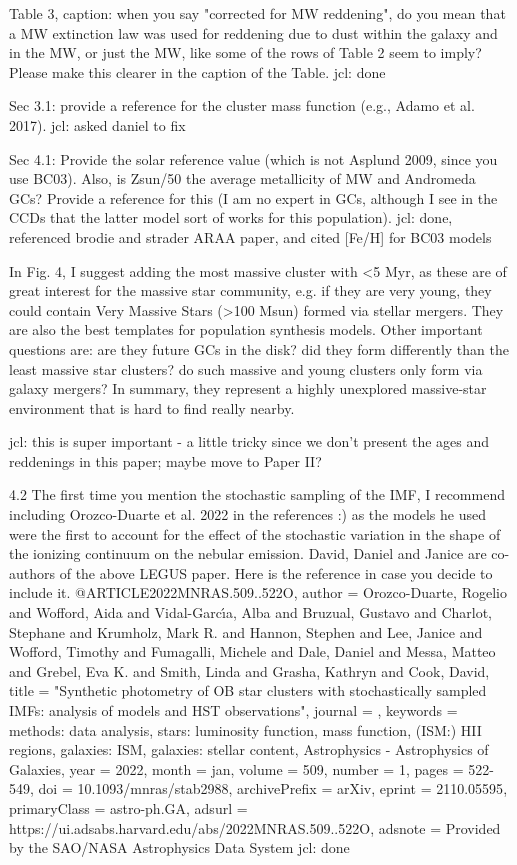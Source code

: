 Table 3, caption: when you say "corrected for MW reddening", do you mean that a MW extinction law was used for reddening due to dust within the galaxy and in the MW, or just the MW, like some of the rows of Table 2 seem to imply? Please make this clearer in the caption of the Table.
jcl: done


Sec 3.1: provide a reference for the cluster mass function (e.g., Adamo et al. 2017). 
jcl: asked daniel to fix


Sec 4.1: Provide the solar reference value (which is not Asplund 2009, since you use BC03). Also, is  Zsun/50 the average metallicity of MW and Andromeda GCs? Provide a reference for this (I am no expert in GCs, although I see in the CCDs that the latter model sort of works for this population).
jcl: done, referenced brodie and strader ARAA paper, and cited [Fe/H] for BC03 models


In Fig. 4, I suggest adding the most massive cluster with <5 Myr, as these are of great interest for the massive star community, e.g. if they are very young, they could contain Very Massive Stars (>100 Msun) formed via stellar mergers. They are also the best templates for population synthesis models. Other important questions are: are they future GCs in the disk? did they form differently than the least massive star clusters? do such massive and young clusters only form via galaxy mergers? In summary, they represent a highly unexplored massive-star environment that is hard to find really nearby.

jcl: this is super important -  a little tricky since we don't present the ages and reddenings in this paper; maybe move to Paper II?


4.2 The first time you mention the stochastic sampling of the IMF, I recommend including Orozco-Duarte et al. 2022 in the references :)  as the models he used were the first to account for the effect of the stochastic variation in the shape of the ionizing continuum on the nebular emission. David, Daniel and Janice are co-authors of the above LEGUS paper. Here is the reference in case you decide to include it.
@ARTICLE{2022MNRAS.509..522O,
       author = {{Orozco-Duarte}, Rogelio and {Wofford}, Aida and {Vidal-Garc{\'\i}a}, Alba and {Bruzual}, Gustavo and {Charlot}, Stephane and {Krumholz}, Mark R. and {Hannon}, Stephen and {Lee}, Janice and {Wofford}, Timothy and {Fumagalli}, Michele and {Dale}, Daniel and {Messa}, Matteo and {Grebel}, Eva K. and {Smith}, Linda and {Grasha}, Kathryn and {Cook}, David},
        title = "{Synthetic photometry of OB star clusters with stochastically sampled IMFs: analysis of models and HST observations}",
      journal = {\mnras},
     keywords = {methods: data analysis, stars: luminosity function, mass function, (ISM:) HII regions, galaxies: ISM, galaxies: stellar content, Astrophysics - Astrophysics of Galaxies},
         year = 2022,
        month = jan,
       volume = {509},
       number = {1},
        pages = {522-549},
          doi = {10.1093/mnras/stab2988},
archivePrefix = {arXiv},
       eprint = {2110.05595},
 primaryClass = {astro-ph.GA},
       adsurl = {https://ui.adsabs.harvard.edu/abs/2022MNRAS.509..522O},
      adsnote = {Provided by the SAO/NASA Astrophysics Data System}
} 
jcl: done

